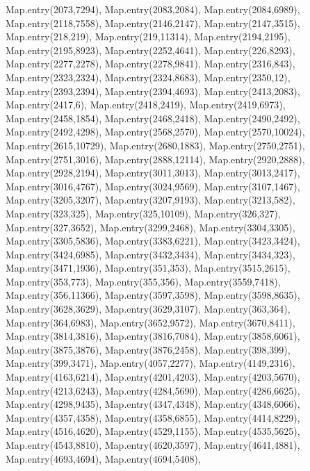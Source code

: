     Map.entry(2073,7294),
    Map.entry(2083,2084),
    Map.entry(2084,6989),
    Map.entry(2118,7558),
    Map.entry(2146,2147),
    Map.entry(2147,3515),
    Map.entry(218,219),
    Map.entry(219,11314),
    Map.entry(2194,2195),
    Map.entry(2195,8923),
    Map.entry(2252,4641),
    Map.entry(226,8293),
    Map.entry(2277,2278),
    Map.entry(2278,9841),
    Map.entry(2316,843),
    Map.entry(2323,2324),
    Map.entry(2324,8683),
    Map.entry(2350,12),
    Map.entry(2393,2394),
    Map.entry(2394,4693),
    Map.entry(2413,2083),
    Map.entry(2417,6),
    Map.entry(2418,2419),
    Map.entry(2419,6973),
    Map.entry(2458,1854),
    Map.entry(2468,2418),
    Map.entry(2490,2492),
    Map.entry(2492,4298),
    Map.entry(2568,2570),
    Map.entry(2570,10024),
    Map.entry(2615,10729),
    Map.entry(2680,1883),
    Map.entry(2750,2751),
    Map.entry(2751,3016),
    Map.entry(2888,12114),
    Map.entry(2920,2888),
    Map.entry(2928,2194),
    Map.entry(3011,3013),
    Map.entry(3013,2417),
    Map.entry(3016,4767),
    Map.entry(3024,9569),
    Map.entry(3107,1467),
    Map.entry(3205,3207),
    Map.entry(3207,9193),
    Map.entry(3213,582),
    Map.entry(323,325),
    Map.entry(325,10109),
    Map.entry(326,327),
    Map.entry(327,3652),
    Map.entry(3299,2468),
    Map.entry(3304,3305),
    Map.entry(3305,5836),
    Map.entry(3383,6221),
    Map.entry(3423,3424),
    Map.entry(3424,6985),
    Map.entry(3432,3434),
    Map.entry(3434,323),
    Map.entry(3471,1936),
    Map.entry(351,353),
    Map.entry(3515,2615),
    Map.entry(353,773),
    Map.entry(355,356),
    Map.entry(3559,7418),
    Map.entry(356,11366),
    Map.entry(3597,3598),
    Map.entry(3598,8635),
    Map.entry(3628,3629),
    Map.entry(3629,3107),
    Map.entry(363,364),
    Map.entry(364,6983),
    Map.entry(3652,9572),
    Map.entry(3670,8411),
    Map.entry(3814,3816),
    Map.entry(3816,7084),
    Map.entry(3858,6061),
    Map.entry(3875,3876),
    Map.entry(3876,2458),
    Map.entry(398,399),
    Map.entry(399,3471),
    Map.entry(4057,2277),
    Map.entry(4149,2316),
    Map.entry(4163,6214),
    Map.entry(4201,4203),
    Map.entry(4203,5670),
    Map.entry(4213,6243),
    Map.entry(4284,5690),
    Map.entry(4286,6625),
    Map.entry(4298,9435),
    Map.entry(4347,4348),
    Map.entry(4348,6066),
    Map.entry(4357,4358),
    Map.entry(4358,6855),
    Map.entry(4414,8229),
    Map.entry(4516,4620),
    Map.entry(4529,1155),
    Map.entry(4535,5625),
    Map.entry(4543,8810),
    Map.entry(4620,3597),
    Map.entry(4641,4881),
    Map.entry(4693,4694),
    Map.entry(4694,5408),
